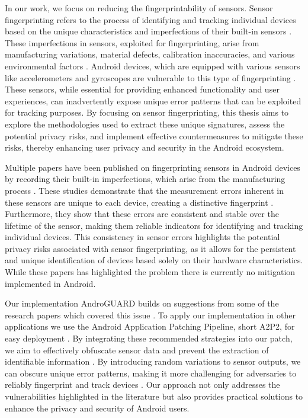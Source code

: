\documentclass[11pt,
  oneside,openany,    %
]{scrreprt}
\begin{document}
In our work, we focus on reducing the fingerprintability of sensors.
Sensor fingerprinting refers to the process of identifying and tracking individual devices based on the unique characteristics and imperfections of their built-in sensors \cite{DBLP:conf/ndss/DeyRXCN14}. 
These imperfections in sensors, exploited for fingerprinting, arise from manufacturing variations, material defects, calibration inaccuracies, and various environmental factors \cite{DBLP:journals/comsur/BaldiniS17, DBLP:journals/popets/DasBC18, DBLP:journals/tifs/ZhangBS21}. 
Android devices, which are equipped with various sensors like accelerometers and gyroscopes are vulnerable to this type of fingerprinting \cite{DBLP:conf/ndss/DasBC16}. 
These sensors, while essential for providing enhanced functionality and user experiences, can inadvertently expose unique error patterns that can be exploited for tracking purposes. 
By focusing on sensor fingerprinting, this thesis aims to explore the methodologies used to extract these unique signatures, assess the potential privacy risks, and implement effective countermeasures to mitigate these risks, thereby enhancing user privacy and security in the Android ecosystem.

Multiple papers have been published on fingerprinting sensors in Android devices by recording their built-in imperfections, which arise from the manufacturing process \cite{das2014poster}. 
These studies demonstrate that the measurement errors inherent in these sensors are unique to each device, creating a distinctive fingerprint \cite{DBLP:conf/ccs/0001ABP18, DBLP:journals/tifs/AmeriniBCMN17}. 
Furthermore, they show that these errors are consistent and stable over the lifetime of the sensor, making them reliable indicators for identifying and tracking individual devices. 
This consistency in sensor errors highlights the potential privacy risks associated with sensor fingerprinting, as it allows for the persistent and unique identification of devices based solely on their hardware characteristics.
While these papers has highlighted the problem there is currently no mitigation implemented in Android.

Our implementation AndroGUARD builds on suggestions from some of the research papers which covered this issue \cite{DBLP:conf/ndss/DasBC16, DBLP:journals/tifs/AmeriniBCMN17, DBLP:conf/ccs/0001ABP18}. 
To apply our implementation in other applications we use the Android Application Patching Pipeline, short A2P2, for easy deployment \cite{DBLP:conf/IEEEares/Draschbacher23}.
By integrating these recommended strategies into our patch, we aim to effectively obfuscate sensor data and prevent the extraction of identifiable information \cite{DBLP:conf/ndss/DasBC16}. 
By introducing random variations to sensor outputs, we can obscure unique error patterns, making it more challenging for adversaries to reliably fingerprint and track devices \cite{DBLP:journals/tifs/AmeriniBCMN17}. 
Our approach not only addresses the vulnerabilities highlighted in the literature but also provides practical solutions to enhance the privacy and security of Android users.
\end{document}
